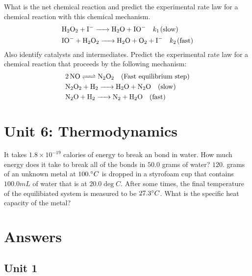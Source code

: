 \documentclass{article}
\begin{document}
\ProblemSet
What is the net chemical reaction and predict the experimental rate law for a chemical reaction with this chemical mechanism.
\begin{equation*}
    \begin{aligned}
        &\ce{H2O2 + I- ->H2O + IO-} \hspace{1em} k_1 \hspace{0.1em} \text{(slow)} \\
        &\ce{IO- + H2O2 -> H2O + O2 + I-} \hspace{1em} k_2 \hspace{0.1em} \text{(fast)}
    \end{aligned}
\end{equation*}
Also identify catalysts and intermediates.
\ProblemSet
Predict the experimental rate law for a chemical reaction that proceeds by the following mechanism:
\begin{equation*}
    \begin{aligned}
        & \ce{2NO <=> N2O2} \hspace{1em} \text{(Fast equilibrium step)} \\
        & \ce{N2O2 + H2 -> H2O + N2O} \hspace{1em} \text{(slow)} \\
        & \ce{N2O + H2 -> N2 + H2O} \hspace{1em} \text{(fast)} 
    \end{aligned}
\end{equation*}
\section{Unit 6: Thermodynamics}
\ProblemSet
It takes \(1.8\times 10^{-19}\) calories of energy to break an  bond in water. How much energy does it take to break all of the 
bonds in \(50.0\) grams of water?
\ProblemSet
\(120.\) grams of an unknown metal at \(100.\degree C\) is dropped in a styrofoam cup  that contains \(100.0mL\) of water that is at \(20.0\deg C\). After some times,
the final temperature of the equilibiated system is measured to be \(27.3\degree C\). What is the specific heat capacity of the metal?



\setcounter{yayCounter}{1}
\newpage
\section{Answers}
\subsection{Unit 1}
\end{document}
